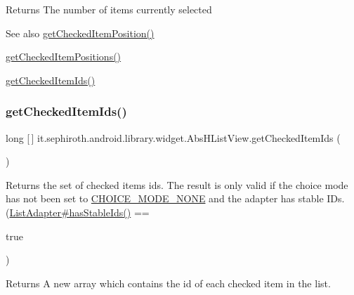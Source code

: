 \begin{DoxyReturn}{Returns}
The number of items currently selected
\end{DoxyReturn}
\begin{DoxySeeAlso}{See also}
\hyperlink{classit_1_1sephiroth_1_1android_1_1library_1_1widget_1_1_abs_h_list_view_a5c1a4a6cf2cda5d86b506cc048ac8155}{get\+Checked\+Item\+Position()} 

\hyperlink{classit_1_1sephiroth_1_1android_1_1library_1_1widget_1_1_abs_h_list_view_ab624d6eb210c1c99a9a8646dbeb0c944}{get\+Checked\+Item\+Positions()} 

\hyperlink{classit_1_1sephiroth_1_1android_1_1library_1_1widget_1_1_abs_h_list_view_a7a212bc367d2dc31f48e313e6f3ef9cf}{get\+Checked\+Item\+Ids()} 
\end{DoxySeeAlso}
\mbox{\label{classit_1_1sephiroth_1_1android_1_1library_1_1widget_1_1_abs_h_list_view_a7a212bc367d2dc31f48e313e6f3ef9cf}} 
\subsubsection{\texorpdfstring{get\+Checked\+Item\+Ids()}{getCheckedItemIds()}}
{\footnotesize\ttfamily long \mbox{[}$\,$\mbox{]} it.\+sephiroth.\+android.\+library.\+widget.\+Abs\+H\+List\+View.\+get\+Checked\+Item\+Ids (\begin{DoxyParamCaption}{ }\end{DoxyParamCaption})}

Returns the set of checked items ids. The result is only valid if the choice mode has not been set to \hyperlink{}{C\+H\+O\+I\+C\+E\+\_\+\+M\+O\+D\+E\+\_\+\+N\+O\+NE} and the adapter has stable I\+Ds. (\hyperlink{}{List\+Adapter\#has\+Stable\+Ids()} ==
\begin{DoxyCode}
\textcolor{keyword}{true} 
\end{DoxyCode}
 )

\begin{DoxyReturn}{Returns}
A new array which contains the id of each checked item in the list. 
\end{DoxyReturn}
\mbox{\label{classit_1_1sephiroth_1_1android_1_1library_1_1widget_1_1_abs_h_list_view_a5c1a4a6cf2cda5d86b506cc048ac8155}} 
